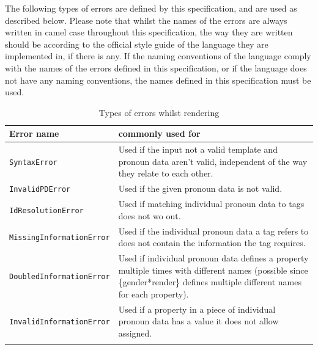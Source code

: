\documentclass{article}
\begin{document}
    The following types of errors are defined by this specification, and are used as described below.
    Please note that whilst the names of the errors are always written in camel case throughout this specification, the way they are written should be according to the official style guide of the language they are implemented in, if there is any.
    If the naming conventions of the language comply with the names of the errors defined in this specification, or if the language does not have any naming conventions, the names defined in this specification must be used.

    \begin{flushleft}
        \begin{center}
            \begin{longtable}{|>{\raggedright\arraybackslash}p{13em} | >{\raggedright\arraybackslash}p{19em} |}
                 \hline
                 Error name & commonly used for \\
                 \hline\hline
                 \texttt{SyntaxError} & Used if the input not a valid template and pronoun data aren't valid, independent of the way they relate to each other. \\
                 \hline
                 \texttt{InvalidPDError} & Used if the given pronoun data is not valid. \\
                 \hline
                 \texttt{IdResolutionError} & Used if matching individual pronoun data to tags does not wo out.\\
                 \hline
                 \texttt{MissingInformationError} & Used if the individual pronoun data a tag refers to does not contain the information the tag requires.\\
                 \hline
                 \texttt{DoubledInformationError} & Used if individual pronoun data defines a property multiple times with different names (possible since \{gender*render\} defines multiple different names for each property). \\
                 \hline
                 \texttt{InvalidInformationError} & Used if a property in a piece of individual pronoun data has a value it does not allow assigned. \\
                 \hline
                \caption{Types of errors whilst rendering}
            \end{longtable}
        \end{center}
    \end{flushleft}
\end{document}

